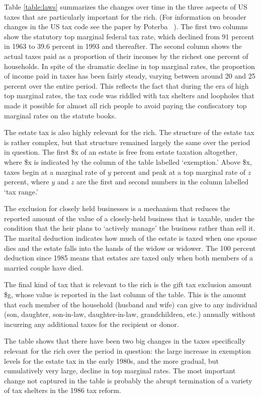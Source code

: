 \documentclass[12pt]{article}
\begin{document}
Table \ref{table:laws} summarizes the changes over time in the three aspects
of US taxes that are particularly important for the rich. (For information
on broader changes in the US tax code see the paper by Poterba~\cite
{poterba:taxportfolios}%
). The first two columns show the statutory top marginal federal tax rate,
which declined from 91 percent in 1963 to 39.6 percent in 1993 and
thereafter. The second column shows the actual taxes paid as a proportion of
their incomes by the richest one percent of households. In spite of the
dramatic decline in top marginal rates, the proportion of income paid in
taxes has been fairly steady, varying between around 20 and 25 percent over
the entire period. This reflects the fact that during the era of high top
marginal rates, the tax code was riddled with tax shelters and loopholes
that made it possible for almost all rich people to avoid paying the
confiscatory top marginal rates on the statute books.

The estate tax is also highly relevant for the rich. The structure of the
estate tax is rather complex, but that structure remained largely the same
over the period in question. The first \$x of an estate is free from estate
taxation altogether, where \$x is indicated by the column of the table
labelled `exemption.' Above \$x, taxes begin at a marginal rate of $y$
percent and peak at a top marginal rate of $z$ percent, where $y$ and $z$
are the first and second numbers in the column labelled `tax range.'

The exclusion for closely held businesses is a mechanism that reduces the
reported amount of the value of a closely-held business that is taxable,
under the condition that the heir plans to `actively manage' the business
rather than sell it. The marital deduction indicates how much of the estate
is taxed when one spouse dies and the estate falls into the hands of the
widow or widower. The 100 percent deduction since 1985 means that estates
are taxed only when both members of a married couple have died.

The final kind of tax that is relevant to the rich is the gift tax exclusion
amount \$g, whose value is reported in the last column of the table. This is
the amount that each member of the household (husband and wife) can give to
any individual (son, daughter, son-in-law, daughter-in-law, grandchildren,
etc.) annually without incurring any additional taxes for the recipient or
donor.

The table shows that there have been two big changes in the taxes
specifically relevant for the rich over the period in question: the large
increase in exemption levels for the estate tax in the early 1980s, and the
more gradual, but cumulatively very large, decline in top marginal rates.
The most important change not captured in the table is probably the abrupt
termination of a variety of tax shelters in the 1986 tax reform.
\end{document}
